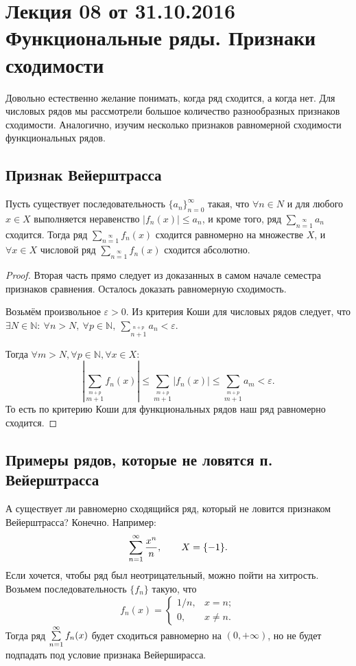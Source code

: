 \documentclass[a4paper, 12pt]{article}
\begin{document}
\pagestyle{fancy}
\section{Лекция 08 от 31.10.2016 \\ Функциональные ряды. Признаки сходимости}
	
	Довольно естественно желание понимать, когда ряд сходится, а когда нет. Для числовых рядов мы рассмотрели большое количество разнообразных признаков сходимости. Аналогично, изучим несколько признаков равномерной сходимости функциональных рядов.
	
	\subsection{Признак Вейерштрасса}
	
	\begin{Test}
		
		Пусть существует последовательность $\{a_n\}_{n=0}^\infty$ такая, что $\forall n \in N$ и для любого $x\in X$ выполняется неравенство $|f_n(x)|\leq a_n$, и кроме того, ряд $\sum_{n=1}\limits^{\infty}a_n$ сходится. Тогда ряд $\sum_{n=1}\limits^{\infty}f_n(x)$ сходится равномерно на множестве $X$, и $\forall x \in X$ числовой ряд $\sum_{n=1}\limits^{\infty}f_n(x)$ сходится абсолютно.
	\end{Test}
	
	\begin{proof}
		Вторая часть прямо следует из доказанных в самом начале семестра признаков сравнения. Осталось доказать равномерную сходимость.
		
		Возьмём произвольное $\varepsilon>0$. Из критерия Коши для числовых рядов следует, что $\exists N\in \mathbb{N}: \ \forall n>N, \ \forall p\in \mathbb{N}, \ \sum_{n+1}\limits^{n+p}a_n < \varepsilon$.
		
		Тогда $\forall m>N, \forall p\in \mathbb{N}, \forall x \in X:$
		\[
		\left| \sum_{m+1}\limits^{m+p}f_n(x)\right|  \leq \sum_{m+1}\limits^{m+p} |f_n(x)| \leq  \sum_{m+1}\limits^{m+p}a_m < \varepsilon.
		\]
		То есть по критерию Коши для функциональных рядов наш ряд равномерно сходится.
	\end{proof}
	
	\subsection{Примеры рядов, которые не ловятся п. Вейерштрасса}
	
	А существует ли равномерно сходящийся ряд, который не ловится признаком Вейерштрасса? Конечно. Например:
	$$
	\sum\limits_{n=1}^{\infty} \frac{x^n}{n}, \qquad X = \{-1\}.
	$$
	Если хочется, чтобы ряд был неотрицательный, можно пойти на хитрость. Возьмем последовательность $\{f_n\}$ такую, что
	$$
	f_n(x) = \begin{cases}
	1/n, & x = n; \\
	0, & x \neq n.
	\end{cases}
	$$
	Тогда ряд $\sum\limits_{n=1}^{\infty} f_n(x)$ будет сходиться равномерно на $(0, +\infty)$, но не будет подпадать под условие признака Вейерширасса.
	
\end{document}
